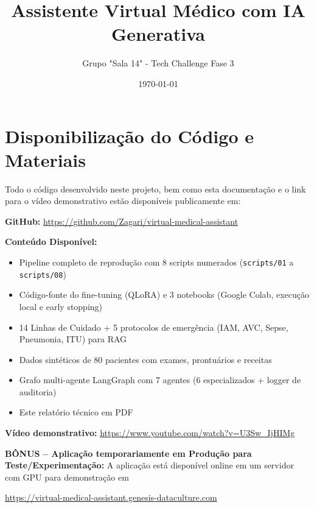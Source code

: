 \documentclass[12pt, a4paper]{report}
\title{Assistente Virtual Médico com IA Generativa}
\author{Grupo "Sala 14" - Tech Challenge Fase 3}
\date{\today}
\begin{document}



\chapter*{Disponibilização do Código e Materiais}

Todo o código desenvolvido neste projeto, bem como esta documentação e o link para o vídeo demonstrativo estão disponíveis publicamente em:
\vspace{1em}

\textbf{GitHub:} \url{https://github.com/Zagari/virtual-medical-assistant}
\vspace{0.8em}

\textbf{Conteúdo Disponível:}
\begin{itemize}
    \item Pipeline completo de reprodução com 8 scripts numerados (\texttt{scripts/01} a \texttt{scripts/08})
    \item Código-fonte do fine-tuning (QLoRA) e 3 notebooks (Google Colab, execução local e early stopping)
    \item 14 Linhas de Cuidado + 5 protocolos de emergência (IAM, AVC, Sepse, Pneumonia, ITU) para RAG
    \item Dados sintéticos de 80 pacientes com exames, prontuários e receitas
    \item Grafo multi-agente LangGraph com 7 agentes (6 especializados + logger de auditoria)
    \item Este relatório técnico em PDF
\end{itemize}
\vspace{0.8em}

\textbf{Vídeo demonstrativo:} \url{https://www.youtube.com/watch?v=U3Sw_IjHIMg}
\vspace{0.8em}

\textbf{BÔNUS -- Aplicação temporariamente em Produção para Teste/Experimentação:} A aplicação está disponível online em um servidor com GPU para demonstração em
\begin{center}
\large\url{https://virtual-medical-assistant.genesis-dataculture.com}
\end{center}
\vspace{0.8em}
\end{document}

